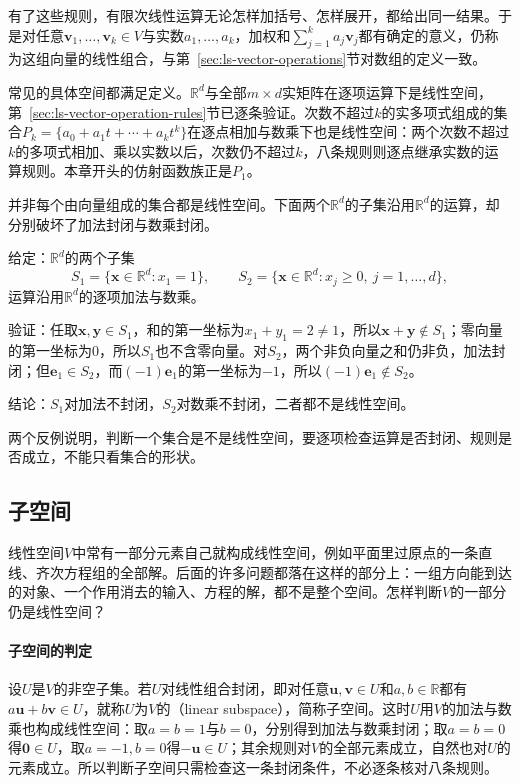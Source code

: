 有了这些规则，有限次线性运算无论怎样加括号、怎样展开，都给出同一结果。于是对任意$\bm v_1,\ldots,\bm v_k\in V$与实数$a_1,\ldots,a_k$，加权和$\sum_{j=1}^ka_j\bm v_j$都有确定的意义，仍称为这组向量的线性组合，与第~\ref{sec:ls-vector-operations}节对数组的定义一致。

常见的具体空间都满足定义。$\mathbb R^d$与全部$m\times d$实矩阵在逐项运算下是线性空间，第~\ref{sec:ls-vector-operation-rules}节已逐条验证。次数不超过$k$的实多项式组成的集合$P_k=\{a_0+a_1t+\cdots+a_kt^k\}$在逐点相加与数乘下也是线性空间：两个次数不超过$k$的多项式相加、乘以实数以后，次数仍不超过$k$，八条规则则逐点继承实数的运算规则。本章开头的仿射函数族正是$P_1$。

并非每个由向量组成的集合都是线性空间。下面两个$\mathbb R^d$的子集沿用$\mathbb R^d$的运算，却分别破坏了加法封闭与数乘封闭。
\begin{example}[反例：仿射约束集与非负向量集]
\label{ex:ls-non-vector-space-sets}
给定：$\mathbb R^d$的两个子集
\[
 S_1=\{\bm x\in\mathbb R^d:x_1=1\},
 \qquad
 S_2=\{\bm x\in\mathbb R^d:x_j\geq0,\ j=1,\ldots,d\},
\]
运算沿用$\mathbb R^d$的逐项加法与数乘。

验证：任取$\bm x,\bm y\in S_1$，和的第一坐标为$x_1+y_1=2\neq1$，所以$\bm x+\bm y\notin S_1$；零向量的第一坐标为$0$，所以$S_1$也不含零向量。对$S_2$，两个非负向量之和仍非负，加法封闭；但$\bm e_1\in S_2$，而$(-1)\bm e_1$的第一坐标为$-1$，所以$(-1)\bm e_1\notin S_2$。

结论：$S_1$对加法不封闭，$S_2$对数乘不封闭，二者都不是线性空间。
\end{example}
两个反例说明，判断一个集合是不是线性空间，要逐项检查运算是否封闭、规则是否成立，不能只看集合的形状。

\subsection{子空间}
\label{sec:ls-subspaces}
\label{sec:linear-algebra-relations}
\label{sec:linear-algebra-subspace-relations}
\label{sec:ls-subspace-definition}

线性空间$V$中常有一部分元素自己就构成线性空间，例如平面里过原点的一条直线、齐次方程组的全部解。后面的许多问题都落在这样的部分上：一组方向能到达的对象、一个作用消去的输入、方程的解，都不是整个空间。怎样判断$V$的一部分仍是线性空间？

\paragraph{子空间的判定}
设$U$是$V$的非空子集。若$U$对线性组合封闭，即对任意$\bm u,\bm v\in U$和$a,b\in\mathbb R$都有$a\bm u+b\bm v\in U$，就称$U$为$V$的（linear subspace），简称子空间。这时$U$用$V$的加法与数乘也构成线性空间：取$a=b=1$与$b=0$，分别得到加法与数乘封闭；取$a=b=0$得$\bm0\in U$，取$a=-1,b=0$得$-\bm u\in U$；其余规则对$V$的全部元素成立，自然也对$U$的元素成立。所以判断子空间只需检查这一条封闭条件，不必逐条核对八条规则。

